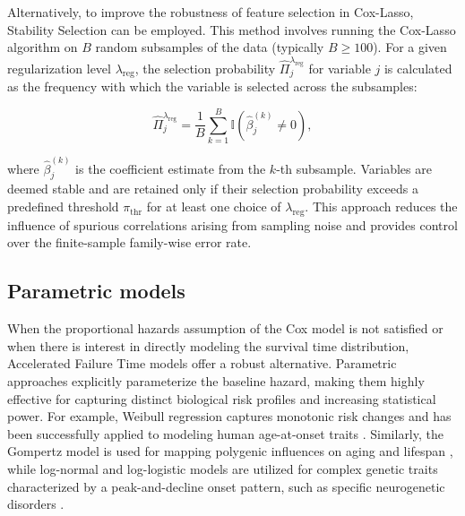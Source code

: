Alternatively, to improve the robustness of feature selection in Cox-Lasso, Stability Selection \cite{meinshausen_stability_2010} can be employed. This method involves running the Cox-Lasso algorithm on $B$ random subsamples of the data (typically $B \ge 100$). For a given regularization level $\lambda_{\text{reg}}$, the selection probability $\hat{\Pi}_j^{\lambda_{\text{reg}}}$ for variable $j$ is calculated as the frequency with which the variable is selected across the subsamples:

\begin{equation}
    \hat{\Pi}_j^{\lambda_{\text{reg}}} = \frac{1}{B} \sum_{k=1}^B \mathbb{I}(\hat{\beta}_{j}^{(k)} \neq 0),
\end{equation}

where $\hat{\beta}_{j}^{(k)}$ is the coefficient estimate from the $k$-th subsample. Variables are deemed stable and are retained only if their selection probability exceeds a predefined threshold $\pi_{\text{thr}}$ for at least one choice of $\lambda_{\text{reg}}$. This approach reduces the influence of spurious correlations arising from sampling noise and provides control over the finite-sample family-wise error rate.


\subsection{Parametric models}
When the proportional hazards assumption of the Cox model is not satisfied or when there is interest in directly modeling the survival time distribution, Accelerated Failure Time models offer a robust alternative. Parametric approaches explicitly parameterize the baseline hazard, making them highly effective for capturing distinct biological risk profiles and increasing statistical power. For example, Weibull regression \cite{Weibull1951ASD} captures monotonic risk changes and has been successfully applied to modeling human age-at-onset traits \cite{Ojavee2021-zu}. Similarly, the Gompertz model is used for mapping polygenic influences on aging and lifespan \cite{Timmers2020}, while log-normal and log-logistic models are utilized for complex genetic traits characterized by a peak-and-decline onset pattern, such as specific neurogenetic disorders \cite{Tezenas2014}.

